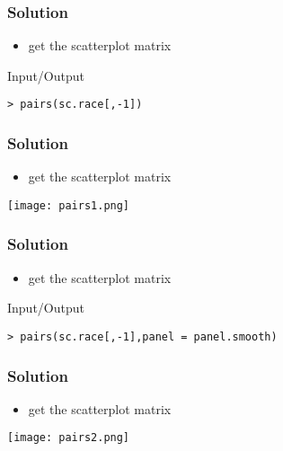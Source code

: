 \begin{frame}[fragile]\frametitle{Solution}
  \begin{itemize}
  \item get the scatterplot matrix
  \end{itemize}
  \begin{exampleblock}{Input/Output}\small
\begin{verbatim}
> pairs(sc.race[,-1])
\end{verbatim}
  \end{exampleblock}
\end{frame}

\begin{frame}[fragile]\frametitle{Solution}
  \begin{itemize}
  \item get the scatterplot matrix
  \end{itemize}
\begin{center}
\texttt{[image: pairs1.png]}
\end{center}
\end{frame}



\begin{frame}[fragile]\frametitle{Solution}
  \begin{itemize}
  \item get the scatterplot matrix
  \end{itemize}
  \begin{exampleblock}{Input/Output}\small
\begin{verbatim}
> pairs(sc.race[,-1],panel = panel.smooth)
\end{verbatim}
  \end{exampleblock}
\end{frame}

\begin{frame}[fragile]\frametitle{Solution}
  \begin{itemize}
  \item get the scatterplot matrix
  \end{itemize}
\begin{center}
\texttt{[image: pairs2.png]}
\end{center}
\end{frame}


